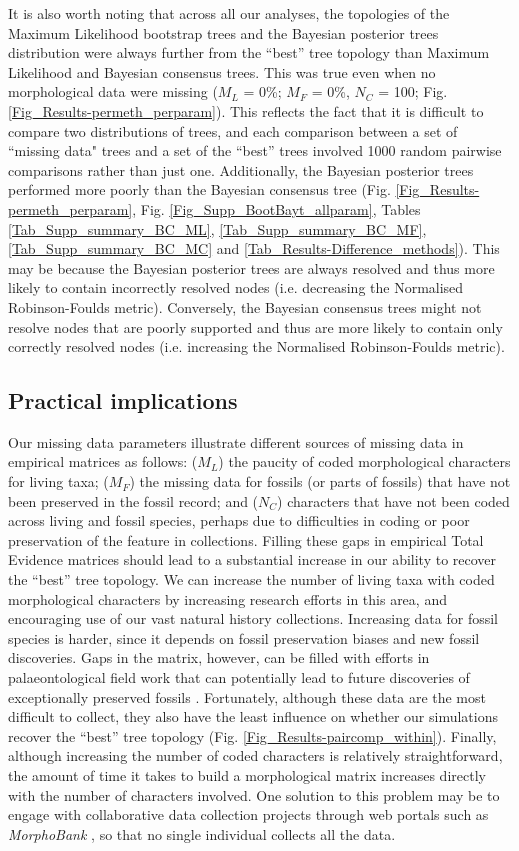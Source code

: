 It is also worth noting that across all our analyses, the topologies of the Maximum Likelihood bootstrap trees and the Bayesian posterior trees distribution were always further from the ``best'' tree topology than Maximum Likelihood and Bayesian consensus trees.
This was true even when no morphological data were missing ($M_{L}$ = 0\%; $M_{F}$ = 0\%, $N_{C}$ = 100; Fig. \ref{Fig_Results-permeth_perparam}).
This reflects the fact that it is difficult to compare two distributions of trees, and each comparison between a set of ``missing data" trees and a set of the ``best'' trees involved 1000 random pairwise comparisons rather than just one.
Additionally, the Bayesian posterior trees performed more poorly than the Bayesian consensus tree (Fig. \ref{Fig_Results-permeth_perparam}, Fig. \ref{Fig_Supp_BootBayt_allparam}, Tables \ref{Tab_Supp_summary_BC_ML}, \ref{Tab_Supp_summary_BC_MF}, \ref{Tab_Supp_summary_BC_MC} and \ref{Tab_Results-Difference_methods}).
This may be because the Bayesian posterior trees are always resolved and thus more likely to contain incorrectly resolved nodes (i.e. decreasing the Normalised Robinson-Foulds metric).
Conversely, the Bayesian consensus trees might not resolve nodes that are poorly supported and thus are more likely to contain only correctly resolved nodes (i.e. increasing the Normalised Robinson-Foulds metric).


\subsection{Practical implications}
Our missing data parameters illustrate different sources of missing data in empirical matrices as follows: ($M_{L}$) the paucity of coded morphological characters for living taxa; ($M_{F}$) the missing data for fossils (or parts of fossils) that have not been preserved in the fossil record; and ($N_{C}$) characters that have not been coded across living and fossil species, perhaps due to difficulties in coding or poor preservation of the feature in collections.
Filling these gaps in empirical Total Evidence matrices should lead to a substantial increase in our ability to recover the ``best'' tree topology.
We can increase the number of living taxa with coded morphological characters by increasing research efforts in this area, and encouraging use of our vast natural history collections.
Increasing data for fossil species is harder, since it depends on fossil preservation biases and new fossil discoveries.
Gaps in the matrix, however, can be filled with efforts in palaeontological field work that can potentially lead to future discoveries of exceptionally preserved fossils \citep[e.g.][]{ni2013oldest}.
Fortunately, although these data are the most difficult to collect, they also have the least influence on whether our simulations recover the ``best'' tree topology (Fig. \ref{Fig_Results-paircomp_within}).
Finally, although increasing the number of coded characters is relatively straightforward, the amount of time it takes to build a morphological matrix increases directly with the number of characters involved.
One solution to this problem may be to engage with collaborative data collection projects through web portals such as \textit{MorphoBank} \citep{morphobank}, so that no single individual collects all the data.

